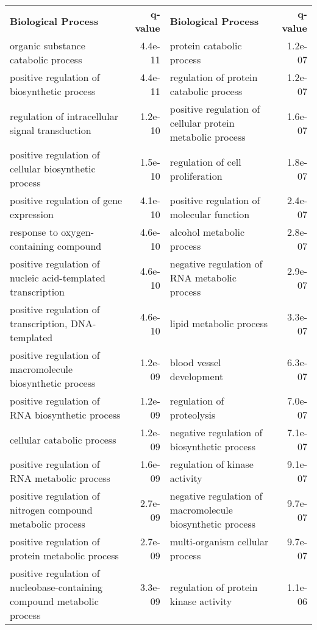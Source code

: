 \documentclass[fleqn,10pt]{SelfArx} %
\begin{document}
\begin{table}[ht]
	\centering
	\scriptsize
	\begin{tabularx}{\textwidth}{lRlR}
		\textbf{\color{white} Biological Process} & \textbf{\color{white} q-value} & \textbf{\color{white} Biological Process} & \textbf{\color{white} q-value}\\
		organic substance catabolic process & 4.4e-11 & protein catabolic process & 1.2e-07 \\ 
		positive regulation of biosynthetic process & 4.4e-11 & regulation of protein catabolic process & 1.2e-07 \\ 
		regulation of intracellular signal transduction & 1.2e-10 & positive regulation of cellular protein metabolic process & 1.6e-07 \\ 
		positive regulation of cellular biosynthetic process & 1.5e-10 & regulation of cell proliferation & 1.8e-07 \\ 
		positive regulation of gene expression & 4.1e-10 & positive regulation of molecular function & 2.4e-07 \\ 
		response to oxygen-containing compound & 4.6e-10 & alcohol metabolic process & 2.8e-07 \\ 
		positive regulation of nucleic acid-templated transcription & 4.6e-10 & negative regulation of RNA metabolic process & 2.9e-07 \\ 
		positive regulation of transcription, DNA-templated & 4.6e-10 & lipid metabolic process & 3.3e-07 \\ 
		positive regulation of macromolecule biosynthetic process & 1.2e-09 & blood vessel development & 6.3e-07 \\ 
		positive regulation of RNA biosynthetic process & 1.2e-09 & regulation of proteolysis & 7.0e-07 \\ 
		cellular catabolic process & 1.2e-09 & negative regulation of biosynthetic process & 7.1e-07 \\ 
		positive regulation of RNA metabolic process & 1.6e-09 & regulation of kinase activity & 9.1e-07 \\ 
		positive regulation of nitrogen compound metabolic process & 2.7e-09 & negative regulation of macromolecule biosynthetic process & 9.7e-07 \\ 
		positive regulation of protein metabolic process & 2.7e-09 & multi-organism cellular process & 9.7e-07 \\ 
		positive regulation of nucleobase-containing compound metabolic process & 3.3e-09 & regulation of protein kinase activity & 1.1e-06 \\ 

\end{tabularx}
\end{table}
\end{document}
